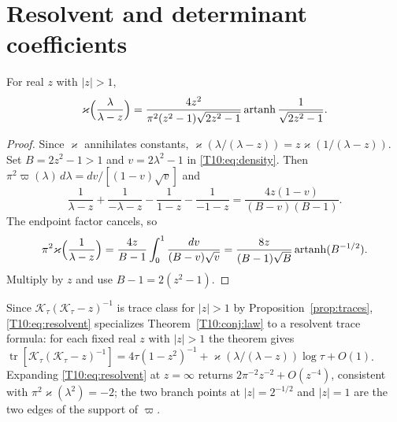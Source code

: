 \section{Resolvent and determinant coefficients}
\begin{proposition}\label{T10:prop:resolvent}
For real $z$ with $|z|>1$,
\begin{equation}\label{T10:eq:resolvent}
 \varkappa\Bigl(\frac\lambda{\lambda-z}\Bigr)
 =\frac{4z^2}{\pi^2(z^2-1)\sqrt{2z^2-1}}
   \operatorname{artanh}\frac1{\sqrt{2z^2-1}} .
\end{equation}
\end{proposition}

\begin{proof}
Since $\varkappa$ annihilates constants,
$\varkappa(\lambda/(\lambda-z))=z\varkappa(1/(\lambda-z))$.
Set $B=2z^2-1>1$ and $v=2\lambda^2-1$ in
\eqref{T10:eq:density}. Then
$\pi^2\varpi(\lambda)\,d\lambda=dv/[(1-v)\sqrt v]$ and
\[
 \frac1{\lambda-z}+\frac1{-\lambda-z}-\frac1{1-z}-\frac1{-1-z}
 =\frac{4z(1-v)}{(B-v)(B-1)}.
\]
The endpoint factor cancels, so
\[
 \pi^2\varkappa\Bigl(\frac1{\lambda-z}\Bigr)
 =\frac{4z}{B-1}\int_0^1\frac{dv}{(B-v)\sqrt v}
 =\frac{8z}{(B-1)\sqrt B}\operatorname{artanh}(B^{-1/2}).
\]
Multiply by $z$ and use $B-1=2(z^2-1)$.
\end{proof}

Since $\mathcal K_\tau(\mathcal K_\tau-z)^{-1}$ is trace class for $|z|>1$ by
Proposition~\ref{prop:traces}, \eqref{T10:eq:resolvent} specializes
Theorem~\ref{T10:conj:law} to a resolvent trace formula: for each fixed real
$z$ with $|z|>1$ the theorem gives
$\operatorname{tr}[\mathcal K_\tau(\mathcal K_\tau-z)^{-1}]
=4\tau(1-z^2)^{-1}+\varkappa(\lambda/(\lambda-z))\log\tau+O(1)$.  Expanding
\eqref{T10:eq:resolvent} at $z=\infty$ returns
$2\pi^{-2}z^{-2}+O(z^{-4})$, consistent with
$\pi^2\varkappa(\lambda^2)=-2$; the two branch points at $|z|=2^{-1/2}$ and
$|z|=1$ are the two edges of the support of $\varpi$.

